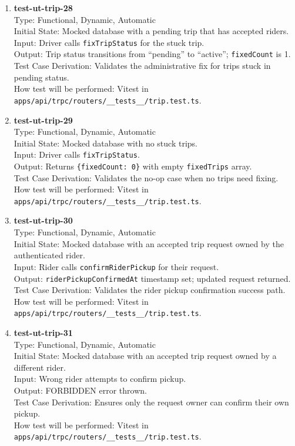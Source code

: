 \documentclass[12pt, titlepage]{article}
\begin{document}
\begin{enumerate}
\item \textbf{test-ut-trip-28}\\
Type: Functional, Dynamic, Automatic\\
Initial State: Mocked database with a pending trip that has accepted riders.\\
Input: Driver calls \texttt{fixTripStatus} for the stuck trip.\\
Output: Trip status transitions from ``pending'' to ``active''; \texttt{fixedCount} is 1.\\
Test Case Derivation: Validates the administrative fix for trips stuck in pending status.\\
How test will be performed: Vitest in \texttt{apps/api/trpc/routers/\_\_tests\_\_/trip.test.ts}.\\

\item \textbf{test-ut-trip-29}\\
Type: Functional, Dynamic, Automatic\\
Initial State: Mocked database with no stuck trips.\\
Input: Driver calls \texttt{fixTripStatus}.\\
Output: Returns \texttt{\{fixedCount: 0\}} with empty \texttt{fixedTrips} array.\\
Test Case Derivation: Validates the no-op case when no trips need fixing.\\
How test will be performed: Vitest in \texttt{apps/api/trpc/routers/\_\_tests\_\_/trip.test.ts}.\\

\item \textbf{test-ut-trip-30}\\
Type: Functional, Dynamic, Automatic\\
Initial State: Mocked database with an accepted trip request owned by the authenticated rider.\\
Input: Rider calls \texttt{confirmRiderPickup} for their request.\\
Output: \texttt{riderPickupConfirmedAt} timestamp set; updated request returned.\\
Test Case Derivation: Validates the rider pickup confirmation success path.\\
How test will be performed: Vitest in \texttt{apps/api/trpc/routers/\_\_tests\_\_/trip.test.ts}.\\

\item \textbf{test-ut-trip-31}\\
Type: Functional, Dynamic, Automatic\\
Initial State: Mocked database with an accepted trip request owned by a different rider.\\
Input: Wrong rider attempts to confirm pickup.\\
Output: FORBIDDEN error thrown.\\
Test Case Derivation: Ensures only the request owner can confirm their own pickup.\\
How test will be performed: Vitest in \texttt{apps/api/trpc/routers/\_\_tests\_\_/trip.test.ts}.\\


\end{enumerate}
\end{document}
